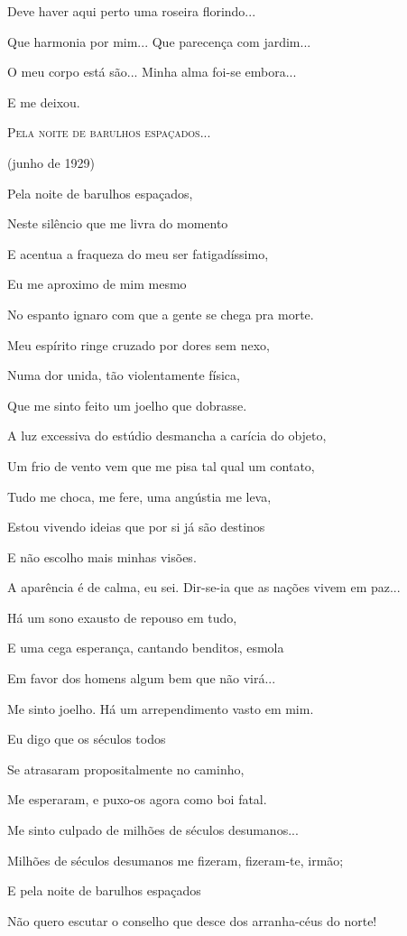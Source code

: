 Deve haver aqui perto uma roseira florindo...

Que harmonia por mim... Que parecença com jardim...

O meu corpo está são... Minha alma foi-se embora...

E me deixou.

\textsc{Pela noite de barulhos espaçados...}

(junho de 1929)

Pela noite de barulhos espaçados,

Neste silêncio que me livra do momento

E acentua a fraqueza do meu ser fatigadíssimo,

Eu me aproximo de mim mesmo

No espanto ignaro com que a gente se chega pra morte.

Meu espírito ringe cruzado por dores sem nexo,

Numa dor unida, tão violentamente física,

Que me sinto feito um joelho que dobrasse.

A luz excessiva do estúdio desmancha a carícia do objeto,

Um frio de vento vem que me pisa tal qual um contato,

Tudo me choca, me fere, uma angústia me leva,

Estou vivendo ideias que por si já são destinos

E não escolho mais minhas visões.

A aparência é de calma, eu sei. Dir-se-ia que as nações vivem em paz...

Há um sono exausto de repouso em tudo,

E uma cega esperança, cantando benditos, esmola

Em favor dos homens algum bem que não virá...

Me sinto joelho. Há um arrependimento vasto em mim.

Eu digo que os séculos todos

Se atrasaram propositalmente no caminho,

Me esperaram, e puxo-os agora como boi fatal.

Me sinto culpado de milhões de séculos desumanos...

Milhões de séculos desumanos me fizeram, fizeram-te, irmão;

E pela noite de barulhos espaçados

Não quero escutar o conselho que desce dos arranha-céus do norte!

